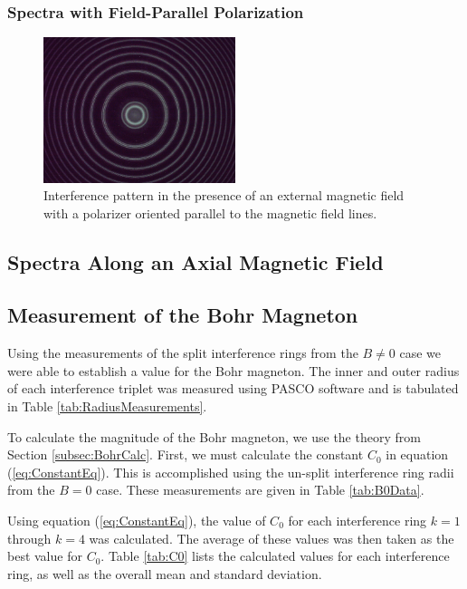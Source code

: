 \documentclass[twocolumn]{article}
\begin{document}
		\subsubsection{Spectra with Field-Parallel Polarization}
		\begin{figure}
			\centering
			\includegraphics[width=0.5\textwidth]{Images/Run2_PerpendicularPolarizer}
			\caption{Interference pattern in the presence of an external magnetic field with a polarizer oriented parallel to the magnetic field lines.}
			\label{fig:Run2_0Deg}
		\end{figure}

		
	\subsection{Spectra Along an Axial Magnetic Field}
	
	\subsection{Measurement of the Bohr Magneton} \label{subsec:BohrMagneton}
		Using the measurements of the split interference rings from the $B\neq 0$ case we were able to establish a value for the Bohr magneton.
		The inner and outer radius of each interference triplet was measured using PASCO software and is tabulated in Table \ref{tab:RadiusMeasurements}.
		
		To calculate the magnitude of the Bohr magneton, we use the theory from Section \ref{subsec:BohrCalc}.
		First, we must calculate the constant $C_0$ in equation (\ref{eq:ConstantEq}).
		This is accomplished using the un-split interference ring radii from the $B=0$ case.
		These measurements are given in Table \ref{tab:B0Data}.
		
		Using equation (\ref{eq:ConstantEq}), the value of $C_0$ for each interference ring $k=1$ through $k=4$ was calculated.
		The average of these values was then taken as the best value for $C_0$.
		Table \ref{tab:C0} lists the calculated values for each interference ring, as well as the overall mean and standard deviation.
		
\end{document}
